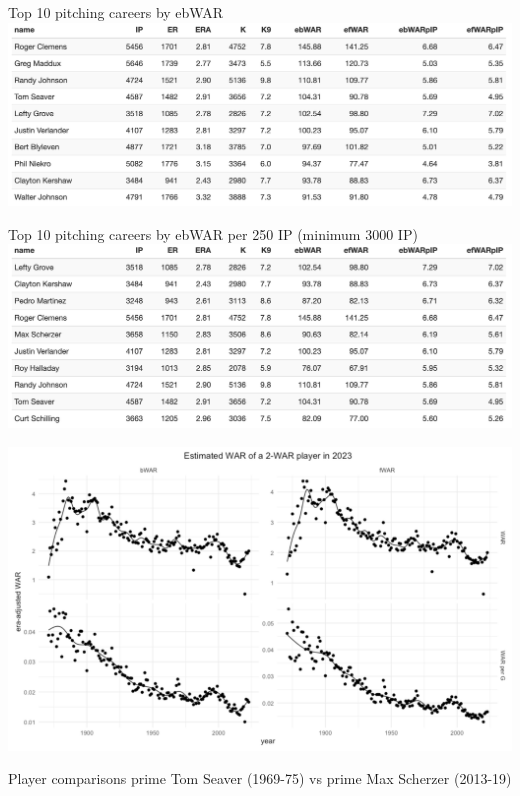 \documentclass[
  ignorenonframetext,
]{beamer}
\begin{document}
\begin{frame}{Top 10 pitching careers by ebWAR}
\protect\hypertarget{top-10-pitching-careers-by-ebwar}{}
\includegraphics{ebWAR_pitchers.png}
\end{frame}

\begin{frame}{Top 10 pitching careers by ebWAR per 250 IP (minimum 3000
IP)}
\protect\hypertarget{top-10-pitching-careers-by-ebwar-per-250-ip-minimum-3000-ip}{}
\includegraphics{ebWARpIP_pitchers.png}
\end{frame}

\begin{frame}{}
\protect\hypertarget{section-14}{}
\includegraphics{2WAR_WARG.png}
\end{frame}

\begin{frame}{Player comparisons}
\protect\hypertarget{player-comparisons}{}
prime Tom Seaver (1969-75) vs prime Max Scherzer (2013-19)
\end{frame}
\end{document}

